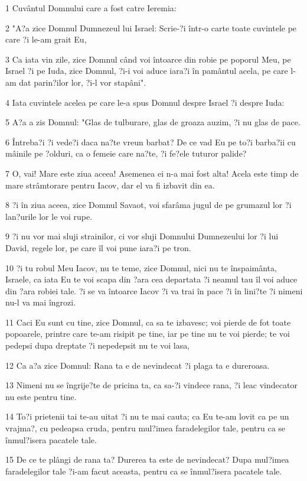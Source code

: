 \par 1 Cuvântul Domnului care a fost catre Ieremia:
\par 2 "A?a zice Domnul Dumnezeul lui Israel: Scrie-?i într-o carte toate cuvintele pe care ?i le-am grait Eu,
\par 3 Ca iata vin zile, zice Domnul când voi întoarce din robie pe poporul Meu, pe Israel ?i pe Iuda, zice Domnul, ?i-i voi aduce iara?i în pamântul acela, pe care l-am dat parin?ilor lor, ?i-l vor stapâni".
\par 4 Iata cuvintele acelea pe care le-a spus Domnul despre Israel ?i despre Iuda:
\par 5 A?a a zis Domnul: "Glas de tulburare, glas de groaza auzim, ?i nu glas de pace.
\par 6 Întreba?i ?i vede?i daca na?te vreun barbat? De ce vad Eu pe to?i barba?ii cu mâinile pe ?olduri, ca o femeie care na?te, ?i fe?ele tuturor palide?
\par 7 O, vai! Mare este ziua aceea! Asemenea ei n-a mai fost alta! Acela este timp de mare strâmtorare pentru Iacov, dar el va fi izbavit din ea.
\par 8 ?i în ziua aceea, zice Domnul Savaot, voi sfarâma jugul de pe grumazul lor ?i lan?urile lor le voi rupe.
\par 9 ?i nu vor mai sluji strainilor, ci vor sluji Domnului Dumnezeului lor ?i lui David, regele lor, pe care îl voi pune iara?i pe tron.
\par 10 ?i tu robul Meu Iacov, nu te teme, zice Domnul, nici nu te înspaimânta, Israele, ca iata Eu te voi scapa din ?ara cea departata ?i neamul tau îl voi aduce din ?ara robiei tale. ?i se va întoarce Iacov ?i va trai în pace ?i în lini?te ?i nimeni nu-l va mai îngrozi.
\par 11 Caci Eu sunt cu tine, zice Domnul, ca sa te izbavesc; voi pierde de fot toate popoarele, printre care te-am risipit pe tine, iar pe tine nu te voi pierde; te voi pedepsi dupa dreptate ?i nepedepsit nu te voi lasa,
\par 12 Ca a?a zice Domnul: Rana ta e de nevindecat ?i plaga ta e dureroasa.
\par 13 Nimeni nu se îngrije?te de pricina ta, ca sa-?i vindece rana, ?i leac vindecator nu este pentru tine.
\par 14 To?i prietenii tai te-au uitat ?i nu te mai cauta; ca Eu te-am lovit ca pe un vrajma?, cu pedeapsa cruda, pentru mul?imea faradelegilor tale, pentru ca se înmul?isera pacatele tale.
\par 15 De ce te plângi de rana ta? Durerea ta este de nevindecat? Dupa mul?imea faradelegilor tale ?i-am facut aceasta, pentru ca se înmul?isera pacatele tale.
